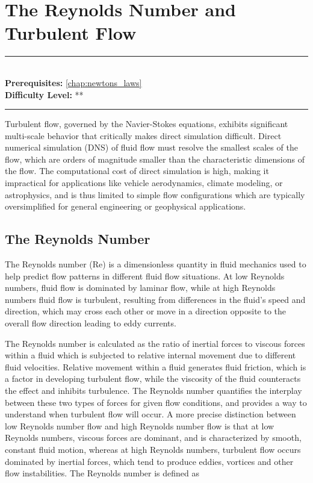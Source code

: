\documentclass[book.tex]{subfiles}
\begin{document}
\chapter{The Reynolds Number and Turbulent Flow}

\label{chap:reynolds}
\noindent\rule{11cm}{0.4pt} \\
\textbf{Prerequisites:}  \autoref{chap:newtons_laws}  \\
\textbf{Difficulty Level:} ** \\
\noindent\rule{11cm}{0.4pt}
\vspace{5mm}

Turbulent flow, governed by the Navier-Stokes equations, exhibits significant multi-scale behavior that critically makes direct simulation difficult. Direct numerical simulation (DNS) of fluid flow must resolve the smallest scales of the flow, which are orders of magnitude smaller than the characteristic dimensions of the flow. The computational cost of direct simulation is high, making it impractical for applications like vehicle aerodynamics, climate modeling, or astrophysics, and is thus limited to simple flow configurations which are typically oversimplified for general engineering or geophysical applications. 

\section{The Reynolds Number}

The Reynolds number (Re) is a dimensionless quantity in fluid mechanics used to help predict flow patterns in different fluid flow situations. At low Reynolds numbers, fluid flow is dominated by laminar flow, while at high Reynolds numbers fluid flow is turbulent, resulting from differences in the fluid's speed and direction, which may cross each other or move in a direction opposite to the overall flow direction leading to eddy currents. 

The Reynolds number is calculated as the ratio of inertial forces to viscous forces within a fluid which is subjected to relative internal movement due to different fluid velocities. Relative movement within a fluid generates fluid friction, which is a factor in developing turbulent flow, while the viscosity of the fluid counteracts the effect and inhibits turbulence. The Reynolds number quantifies the interplay between these two types of forces for given flow conditions, and provides a way to understand when turbulent flow will occur. A more precise distinction between low Reynolds number flow and high Reynolds number flow is that at low Reynolds numbers, viscous forces are dominant, and is characterized by smooth, constant fluid motion, whereas at high Reynolds numbers, turbulent flow occurs dominated by inertial forces, which tend to produce eddies, vortices and other flow instabilities. The Reynolds number is defined as
\end{document}
